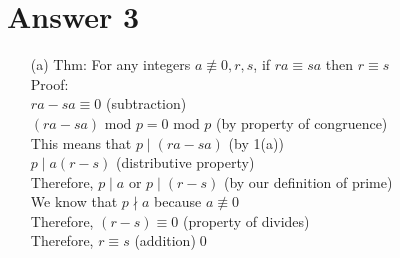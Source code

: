 \documentclass[11pt]{article}
\theoremstyle{definition}
\begin{document}
\section*{Answer 3}
\begin{enumerate}
	\item[(a)]
	Thm: For any integers $a \not\equiv 0, r, s$, if $ra \equiv sa$ then $r \equiv s$\\
	Proof: \\
	$ra - sa \equiv 0$ (subtraction)\\
	$(ra - sa) \text{ mod } p = 0 \text{ mod } p$ (by property of congruence)\\
	This means that $p \mid (ra - sa)$ (by 1(a))\\
	$p \mid a(r - s)$ (distributive property)\\
	Therefore, $p \mid a$ or $p \mid (r - s)$ (by our definition of prime)\\
	We know that $p \nmid a$ because $a \not \equiv 0$\\
	Therefore, $(r - s) \equiv 0$ (property of divides)\\
	Therefore, $r \equiv s$ (addition)\qed


\end{enumerate}
\end{document}
